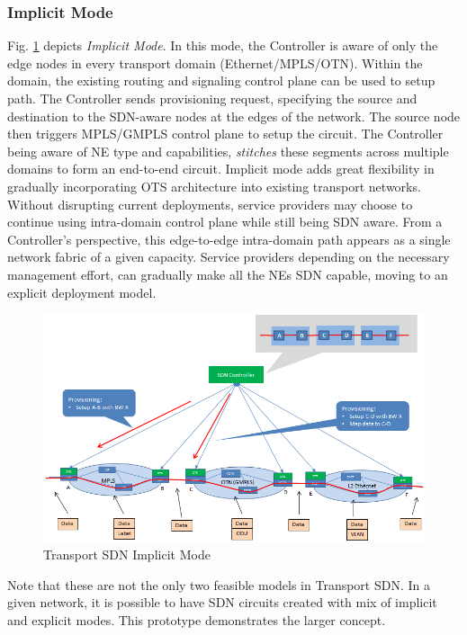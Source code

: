 \documentclass{sig-alternate-2013}
\begin{document}
 \subsubsection{Implicit Mode} Fig. \ref{fig:OTSImplicit} depicts \textit{Implicit Mode}. In this mode,
 the Controller is aware of only the edge nodes in every transport domain (Ethernet/MPLS/OTN). Within the
 domain, the existing routing and signaling control plane can be used to setup path. The
 Controller sends provisioning request, specifying the source and destination to the SDN-aware nodes
 at the edges of the network. The source node then triggers MPLS/GMPLS control plane to setup the circuit.
 The Controller being aware of NE type and capabilities, \textit{stitches} these segments across multiple
 domains to form an end-to-end circuit. Implicit mode adds great flexibility in gradually incorporating
 OTS architecture into existing transport networks. Without disrupting current deployments, service
 providers may choose to continue using intra-domain control plane while still being SDN aware. From a
 Controller's perspective, this edge-to-edge intra-domain path appears as a single network fabric of a
 given capacity. Service providers depending on the necessary management effort, can gradually make
 all the NEs SDN capable, moving to an explicit deployment model.\\

 \begin{figure}[htb]
 \centering
 \includegraphics[scale=0.37]{OTSImplicit.png}
 \caption{Transport SDN Implicit Mode}
 \label{fig:OTSImplicit}
 \end{figure}

 Note that these are not the only two feasible models in Transport SDN. In a given network, it is possible to have
 SDN circuits created with mix of implicit and explicit modes. This prototype demonstrates the larger concept.
\end{document}
